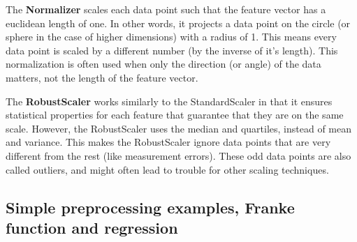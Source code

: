 \documentclass[%
oneside,                 %
final,                   %
10pt]{article}
\begin{document}
The \textbf{Normalizer} scales each data
point such that the feature vector has a euclidean length of one. In other words, it
projects a data point on the circle (or sphere in the case of higher dimensions) with a
radius of 1. This means every data point is scaled by a different number (by the
inverse of it’s length).
This normalization is often used when only the direction (or angle) of the data matters,
not the length of the feature vector.

The \textbf{RobustScaler} works similarly to the StandardScaler in that it
ensures statistical properties for each feature that guarantee that
they are on the same scale. However, the RobustScaler uses the median
and quartiles, instead of mean and variance. This makes the
RobustScaler ignore data points that are very different from the rest
(like measurement errors). These odd data points are also called
outliers, and might often lead to trouble for other scaling
techniques.



\subsection*{Simple preprocessing examples, Franke function and regression}
\end{document}

